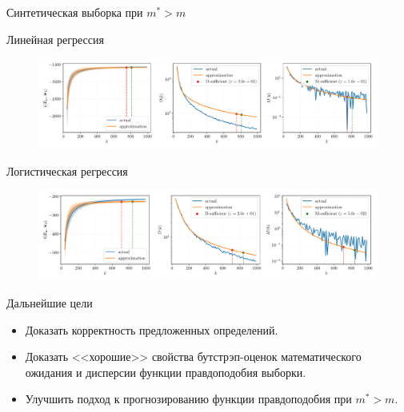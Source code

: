 \documentclass{beamer}
\begin{document}
\begin{frame}{Синтетическая выборка при $m^* > m$}
    \begin{center}
        Линейная регрессия
    \end{center}
    \begin{figure}[h!]
        \centering
        \includegraphics[width=\textwidth]{paper/figures/synthetic-regression-approximation.pdf}
        \label{synthetic-regression-approximation}
    \end{figure}
    \vspace{-1cm}
    \begin{center}
        Логистическая регрессия
    \end{center}
    \begin{figure}[h!]
        \centering
        \includegraphics[width=\textwidth]{paper/figures/synthetic-classification-approximation.pdf}
        \label{synthetic-classification-approximation}
    \end{figure}
\end{frame}
\begin{frame}{Дальнейшие цели}
    \begin{itemize}
        \item Доказать корректность предложенных определений.
        \item Доказать <<хорошие>> свойства бутстрэп-оценок математического ожидания и дисперсии функции правдоподобия выборки.
        \item Улучшить подход к прогнозированию функции правдоподобия при $m^* > m$.
    \end{itemize}
\end{frame}
\end{document}
